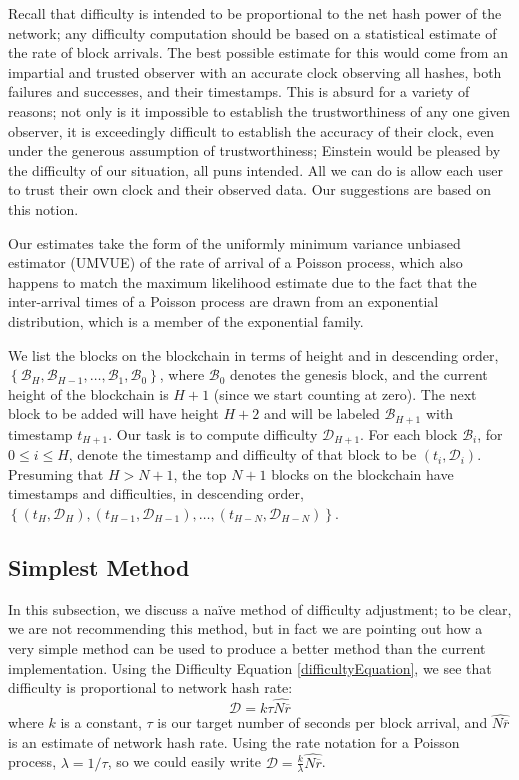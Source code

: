 \documentclass[12pt,english]{mrl}
\theoremstyle{definition}
\renewcommand{\leq}{\leqslant}
\numberwithin{equation}{section}
\numberwithin{figure}{section}
\numberwithin{equation}{section}
\numberwithin{equation}{section}
\numberwithin{figure}{section}
\begin{document}
Recall that difficulty is intended to be proportional to the net hash power of the network; any difficulty computation should be based on a statistical estimate of the rate of block arrivals. The best possible estimate for this would come from an impartial and trusted observer with an accurate clock observing all hashes, both failures and successes, and their timestamps. This is absurd for a variety of reasons; not only is it impossible to establish the trustworthiness of any one given observer, it is exceedingly difficult to establish the accuracy of their clock, even under the generous assumption of trustworthiness; Einstein would be pleased by the difficulty of our situation, all puns intended. All we can do is allow each user to trust their own clock and their observed data. Our suggestions are based on this notion. 

Our estimates take the form of the uniformly minimum variance unbiased estimator (UMVUE) of the rate of arrival of a Poisson process, which also happens to match the maximum likelihood estimate due to the fact that the inter-arrival times of a Poisson process are drawn from an exponential distribution, which is a member of the exponential family.

We list the blocks on the blockchain in terms of height and in descending order, $\left\{\mathcal{B}_H,\mathcal{B}_{H-1}, \ldots,\mathcal{B}_1, \mathcal{B}_0\right\}$, where $\mathcal{B}_0$ denotes the genesis block, and the current height of the blockchain is $H+1$ (since we start counting at zero). The next block to be added will have height $H+2$ and will be labeled $\mathcal{B}_{H+1}$ with timestamp $t_{H+1}$. Our task is to compute difficulty $\mathcal{D}_{H+1}$. For each block $\mathcal{B}_i$, for $0 \leq i \leq H$, denote the timestamp and difficulty of that block to be $(t_i,\mathcal{D}_i)$. Presuming that $H > N+1$, the top $N+1$ blocks on the blockchain have timestamps and difficulties, in descending order, $\left\{(t_{H},\mathcal{D}_{H}),(t_{H-1},\mathcal{D}_{H-1}),\ldots,(t_{H-N},\mathcal{D}_{H-N})\right\}$.


\subsection{Simplest Method}
In this subsection, we discuss a na\"{i}ve method of difficulty adjustment; to be clear, we are not recommending this method, but in fact we are pointing out how a very simple method can be used to produce a better method than the current implementation. Using the Difficulty Equation \ref{difficultyEquation}, we see that difficulty is proportional to network hash rate:
\[\mathcal{D} = k\tau \widehat{N\overline{r}}\]
where $k$ is a constant, $\tau$ is our target number of seconds per block arrival, and $\widehat{N\overline{r}}$ is an estimate of network hash rate. Using the rate notation for a Poisson process, $\lambda = 1/\tau$, so we could easily write $\mathcal{D} = \frac{k}{\lambda} \widehat{N\overline{r}}$.
\end{document}
